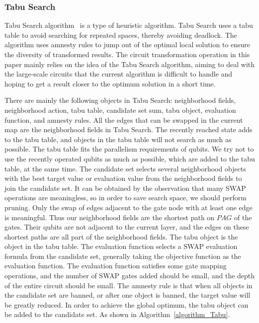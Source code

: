 \documentclass[runningheads]{llncs}
\begin{document}
\subsubsection{Tabu Search}
Tabu Search algorithm~\cite{Glover1990} is a type of heuristic algorithm. Tabu Search uses a tabu table to avoid searching for repeated spaces, thereby avoiding deadlock. The algorithm uses amnesty rules to jump out of the optimal local solution to ensure the diversity of transformed results. The circuit transformation operation in this paper mainly relies on the idea of the Tabu Search algorithm, aiming to deal with the large-scale circuits that the current algorithm is difficult to handle and hoping to get a result closer to the optimum solution in a short time.


There are mainly the following objects in Tabu Search: neighborhood fields, neighborhood action, tabu table, candidate set sum, tabu object, evaluation function, and amnesty rules. All the edges that can be swapped in the current map are the neighborhood fields in Tabu Search. The recently reached state adds to the tabu table, and objects in the tabu table will not search as much as possible. The tabu table fits the parallelism requirements of qubits. We try not to use the recently operated qubits as much as possible, which are added to the tabu table, at the same time. The candidate set selects several neighborhood objects with the best target value or evaluation value from the neighborhood fields to join the candidate set. It can be obtained by the observation that many SWAP operations are meaningless, so in order to save search space, we should perform pruning. Only the swap of edges adjacent to the gate node with at least one edge is meaningful. Thus our neighborhood fields are the shortest path on $PAG$ of the gates. 
Their qubits are not adjacent to the current layer, and the edges on these shortest paths are all part of the neighborhood fields.
The tabu object is the object in the tabu table. The evaluation function selects a SWAP evaluation formula from the candidate set, 
generally taking the objective function as the evaluation function. The evaluation function satisfies some gate mapping operations, 
and the number of SWAP gates added should be small, and the depth of the entire circuit should be small. The amnesty rule is that when all objects in the candidate set are banned,  or after one object is banned, the target value will be greatly reduced. In order to achieve the global optimum, the tabu object can be added to the candidate set. As shown in Algorithm~\ref{algorithm_Tabu}.
\end{document}
